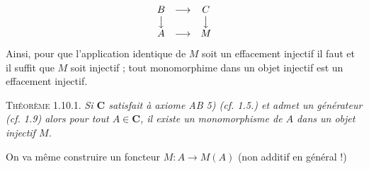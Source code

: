 \[
\begin{array}{ccc}
B & \longrightarrow & C \\
\big\downarrow && \big\downarrow \\
A & \longrightarrow & M
\end{array}
\]
Ainsi, pour que l'application identique de $M$ soit un effacement injectif il
faut et il suffit que $M$ soit injectif ; tout monomorphime dans un objet
injectif est un effacement injectif.

\textsc{Théorème 1.10.1.} \textit{Si $\mathbf{C}$ satisfait à axiome
\textup{AB 5) (}\textit{cf.} \textup{1.5.)} et admet un générateur \textup{(}\textit{cf.} \textup{1.9)} alors pour tout $A\in \mathbf{C}$, il
existe un monomorphisme de $A$ dans un objet injectif $M$.}

On va même construire un foncteur
$M:A\to M(A)$ (non additif en général !)


